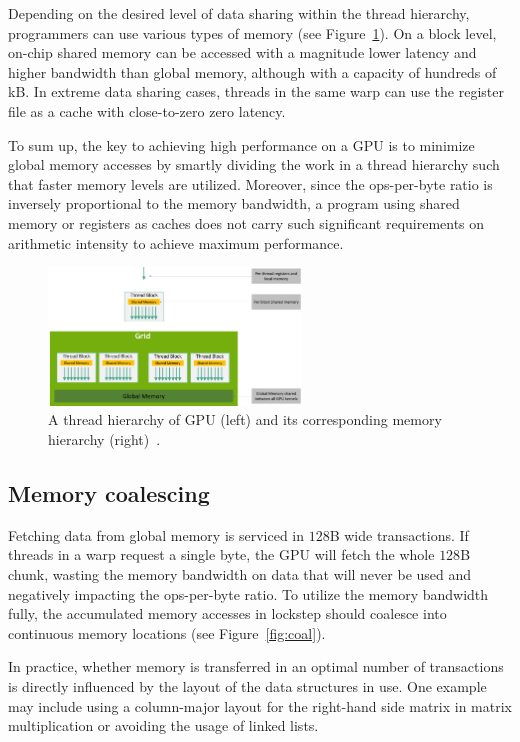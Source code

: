 Depending on the desired level of data sharing within the thread hierarchy, programmers can use various types of memory (see Figure~\ref{fig:mem-hierarchy}). On a block level, on-chip shared memory can be accessed with a magnitude lower latency and higher bandwidth than global memory, although with a capacity of hundreds of kB. In extreme data sharing cases, threads in the same warp can use the register file as a cache with close-to-zero zero latency.

To sum up, the key to achieving high performance on a GPU is to minimize global memory accesses by smartly dividing the work in a thread hierarchy such that faster memory levels are utilized. Moreover, since the ops-per-byte ratio is inversely proportional to the memory bandwidth, a program using shared memory or registers as caches does not carry such significant requirements on arithmetic intensity to achieve maximum performance.

\begin{figure}
    \centering
    \includegraphics[width=0.6\textwidth]{img/mem-hierarchy-2.png}
    \caption{A thread hierarchy of GPU (left) and its corresponding memory hierarchy (right)~\cite{site:cuda}.}
    \label{fig:mem-hierarchy}
\end{figure}

\subsection{Memory coalescing}
\label{sec:coalescing}

Fetching data from global memory is serviced in $128$B wide transactions. If threads in a warp request a single byte, the GPU will fetch the whole $128$B chunk, wasting the memory bandwidth on data that will never be used and negatively impacting the ops-per-byte ratio. To utilize the memory bandwidth fully, the accumulated memory accesses in lockstep should coalesce into continuous memory locations (see Figure~\ref{fig:coal}).

In practice, whether memory is transferred in an optimal number of transactions is directly influenced by the layout of the data structures in use. One example may include using a column-major layout for the right-hand side matrix in matrix multiplication or avoiding the usage of linked lists.

